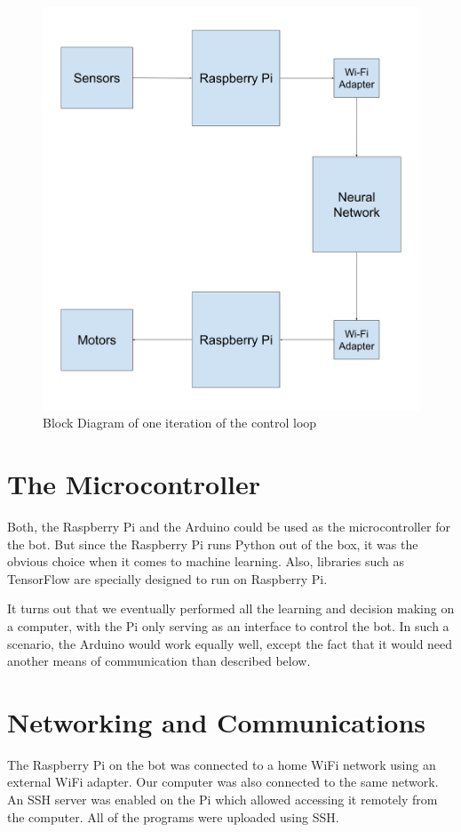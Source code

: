 \documentclass[12pt]{extreport}
\begin{document}
\begin{figure}
    \includegraphics[width=\textwidth]{block-diagram}
    \caption{Block Diagram of one iteration of the control loop}
\end{figure}

\section{The Microcontroller}
Both, the Raspberry Pi and the Arduino could be used as the microcontroller for the bot. But since the Raspberry Pi runs Python out of the box, it was the obvious choice when it comes to machine learning. Also, libraries such as TensorFlow are specially designed to run on Raspberry Pi.

It turns out that we eventually performed all the learning and decision making on a computer, with the Pi only serving as an interface to control the bot. In such a scenario, the Arduino would work equally well, except the fact that it would need another means of communication than described below.

\section{Networking and Communications}
The Raspberry Pi on the bot was connected to a home WiFi network using an external WiFi adapter. Our computer was also connected to the same network.
An SSH server was enabled on the Pi which allowed accessing it remotely from the computer. All of the programs were uploaded using SSH.
\end{document}
